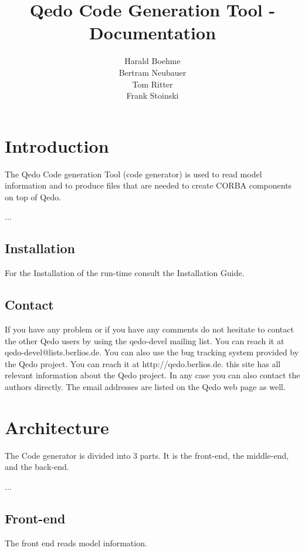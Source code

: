 \documentclass[12pt,a4paper]{report}
\begin{document}
\title{Qedo Code Generation Tool - Documentation}
\author{Harald Boehme \\ Bertram Neubauer \\ Tom Ritter \\ Frank Stoinski}

\maketitle

\setcounter{page}{1} 

\tableofcontents


\chapter{Introduction}
\label{sec:Introduction}

The Qedo Code generation Tool (code generator) is used to read model information and to produce files that are needed to create CORBA components on top of Qedo.

...
\section{Installation}
\label{sec:Installation}
For the Installation of the run-time consult the Installation Guide.


\section{Contact}
\label{sec:Contact}

If you have any problem or if you have any comments do not hesitate to contact the other Qedo users by using the qedo-devel mailing list. You can reach it at qedo-devel@lists.berlios.de. You can also use the bug tracking system provided by the Qedo project. You can reach it at http://qedo.berlios.de. this site has all relevant information about the Qedo project. In any case you can also contact the authors directly. The email addresses are listed on the Qedo web page as well.



	 
\chapter{Architecture}
\label{sec:Architecture}
The Code generator is divided into 3 parts. It is the front-end, the middle-end, and the back-end.

 ...

\section{Front-end}
\label{sec:FrontEnd}
The front end reads model information.
\end{document}
